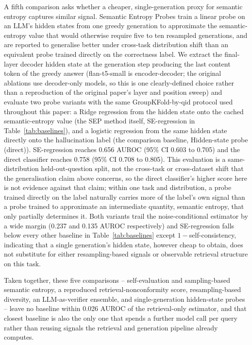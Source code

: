 \documentclass[sn-basic]{sn-jnl}
\theoremstyle{thmstyleone}
\theoremstyle{thmstyletwo}
\begin{document}
A fifth comparison asks whether a cheaper, single-generation proxy for
semantic entropy captures similar signal. Semantic Entropy Probes
\citep{kossen2024sep} train a linear probe on an LLM's hidden states from
one greedy generation to approximate the semantic-entropy value that would
otherwise require five to ten resampled generations, and are reported to
generalise better under cross-task distribution shift than an equivalent
probe trained directly on the correctness label. We extract the
final-layer decoder hidden state at the generation step producing the last
content token of the greedy answer (flan-t5-small is encoder-decoder; the
original ablations use decoder-only models, so this is one clearly-defined
choice rather than a reproduction of the original paper's layer and
position sweep) and evaluate two probe variants with the same
GroupKFold-by-qid protocol used throughout this paper: a Ridge regression
from the hidden state onto the cached semantic-entropy value (the SEP
method itself, SE-regression in Table~\ref{tab:baselines}), and a logistic
regression from the same hidden state directly onto the hallucination
label (the comparison baseline, Hidden-state probe (direct)). SE-regression
reaches 0.656 AUROC (95\% CI 0.603 to 0.705) and the direct classifier
reaches 0.758 (95\% CI 0.708 to 0.805). This evaluation is a
same-distribution held-out-question split, not the cross-task or
cross-dataset shift that the generalisation claim above concerns, so the
direct classifier's higher score here is not evidence against that claim;
within one task and distribution, a probe trained directly on the label
naturally carries more of the label's own signal than a probe trained to
approximate an intermediate quantity, semantic entropy, that only
partially determines it. Both variants trail the noise-conditional
estimator by a wide margin (0.237 and 0.135 AUROC respectively) and
SE-regression falls below every other baseline in Table~\ref{tab:baselines}
except $1-$self-consistency, indicating that a single generation's hidden
state, however cheap to obtain, does not substitute for either
resampling-based signals or observable retrieval structure on this task.

Taken together, these five comparisons -- self-evaluation and
sampling-based semantic entropy, a reproduced retrieval-nonconformity
score, resampling-based diversity, an LLM-as-verifier ensemble, and
single-generation hidden-state probes -- leave no baseline within 0.026
AUROC of the retrieval-only estimator, and that closest baseline is also
the only one that spends a further model call per query rather than
reusing signals the retrieval and generation pipeline already computes.
\end{document}
